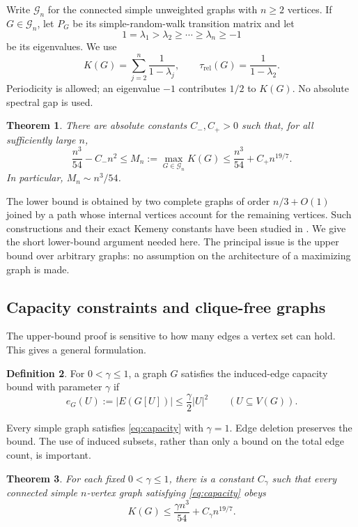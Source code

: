 \documentclass[11pt]{amsart}
\numberwithin{equation}{section}
\newtheorem{theorem}{Theorem}[section]
\theoremstyle{definition}
\newtheorem{definition}[theorem]{Definition}
\theoremstyle{remark}
\newcommand{\trel}{\tau_{\mathrm{rel}}}
\newcommand{\cG}{\mathcal G}
\begin{document}
Write $\cG_n$ for the connected simple unweighted graphs with $n\ge2$ vertices. If $G\in\cG_n$, let $P_G$ be its simple-random-walk transition matrix and let
\[
1=\lambda_1>\lambda_2\ge\cdots\ge\lambda_n\ge-1
\]
be its eigenvalues. We use
\begin{equation}\label{eq:Kdef}
K(G)=\sum_{j=2}^n\frac1{1-\lambda_j},\qquad
\trel(G)=\frac1{1-\lambda_2}.
\end{equation}
Periodicity is allowed; an eigenvalue $-1$ contributes $1/2$ to $K(G)$. No absolute spectral gap is used.

\begin{theorem}\label{thm:main}
There are absolute constants $C_-,C_+>0$ such that, for all sufficiently large $n$,
\begin{equation}\label{eq:main}
\frac{n^3}{54}-C_-n^2
\le M_n:=\max_{G\in\cG_n}K(G)
\le\frac{n^3}{54}+C_+n^{19/7}.
\end{equation}
In particular, $M_n\sim n^3/54$.
\end{theorem}

The lower bound is obtained by two complete graphs of order $n/3+O(1)$ joined by a path whose internal vertices account for the remaining vertices. Such constructions and their exact Kemeny constants have been studied in \cite{Breen,Faught}. We give the short lower-bound argument needed here. The principal issue is the upper bound over arbitrary graphs: no assumption on the architecture of a maximizing graph is made.

\subsection{Capacity constraints and clique-free graphs}
The upper-bound proof is sensitive to how many edges a vertex set can hold. This gives a general formulation.

\begin{definition}\label{def:capacity}
For $0<\gamma\le1$, a graph $G$ satisfies the induced-edge capacity bound with parameter $\gamma$ if
\begin{equation}\label{eq:capacity}
e_G(U):=|E(G[U])|\le\frac\gamma2|U|^2
\qquad(U\subseteq V(G)).
\end{equation}
\end{definition}
Every simple graph satisfies \eqref{eq:capacity} with $\gamma=1$. Edge deletion preserves the bound. The use of induced subsets, rather than only a bound on the total edge count, is important.

\begin{theorem}\label{thm:capacity}
For each fixed $0<\gamma\le1$, there is a constant $C_\gamma$ such that every connected simple $n$-vertex graph satisfying \eqref{eq:capacity} obeys
\begin{equation}\label{eq:capacityK}
K(G)\le\frac{\gamma n^3}{54}+C_\gamma n^{19/7}.
\end{equation}
\end{theorem}
\end{document}
